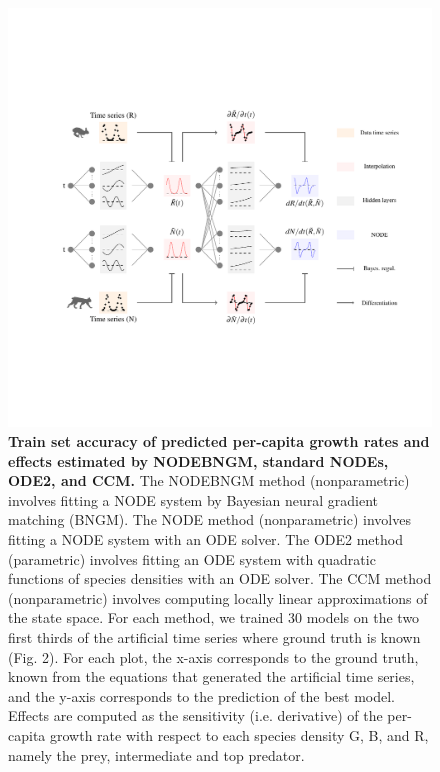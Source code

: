 \documentclass[11pt, oneside]{article}
\begin{document}
\begin{figure}[H]
\includegraphics[width=1\linewidth,page=9]{figures/main.pdf}
\caption{
    \textbf{Train set accuracy of predicted per-capita growth rates and effects estimated by NODEBNGM, standard NODEs, ODE2, and CCM.}
    The NODEBNGM method (nonparametric) involves fitting a NODE system by Bayesian neural gradient matching (BNGM). 
    The NODE method (nonparametric) involves fitting a NODE system with an ODE solver. 
    The ODE2 method (parametric) involves fitting an ODE system with quadratic functions of species densities with an ODE solver. 
    The CCM method (nonparametric) involves computing locally linear approximations of the state space. 
    For each method, we trained 30 models on the two first thirds of the artificial time series where ground truth is known (Fig. 2). 
    For each plot, the x-axis corresponds to the ground truth, known from the equations that generated the artificial time series, and the y-axis corresponds to the prediction of the best model. 
    Effects are computed as the sensitivity (i.e. derivative) of the per-capita growth rate with respect to each species density G, B, and R, namely the prey, intermediate and top predator.
}
\end{figure}
\newpage
\end{document}
